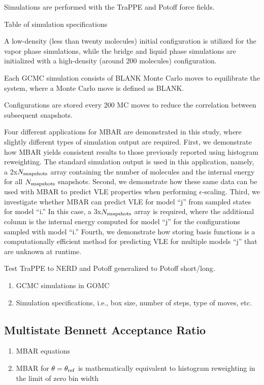 \documentclass[11pt,a4paper]{article}
\begin{document}
Simulations are performed with the TraPPE and Potoff force fields.

Table of simulation specifications 

A low-density (less than twenty molecules) initial configuration is utilized for the vapor phase simulations, while the bridge and liquid phase simulations are initialized with a high-density (around 200 molecules) configuration.

Each GCMC simulation consists of BLANK Monte Carlo moves to equilibrate the system, where a Monte Carlo move is defined as BLANK. 

Configurations are stored every 200 MC moves to reduce the correlation between subsequent snapshots.

Four different applications for MBAR are demonstrated in this study, where slightly different types of simulation output are required. First, we demonstrate how MBAR yields consistent results to those previously reported using histogram reweighting. The standard simulation output is used in this application, namely, a 2x$N_{\rm snapshots}$ array containing the number of molecules and the internal energy for all $N_{\rm snapshots}$ snapshots. Second, we demonstrate how these same data can be used with MBAR to predict VLE properties when performing $\epsilon$-scaling. Third, we investigate whether MBAR can predict VLE for model ``j'' from sampled states for model ``i.'' In this case, a 3x$N_{\rm snapshots}$ array is required, where the additional column is the internal energy computed for model ``j'' for the configurations sampled with model ``i.'' Fourth, we demonstrate how storing basis functions is a computationally efficient method for predicting VLE for multiple models ``j'' that are unknown at runtime.   

Test TraPPE to NERD and Potoff generalized to Potoff short/long.

\begin{enumerate}
	\item GCMC simulations in GOMC
	\item Simulation specifications, i.e., box size, number of steps, type of moves, etc.
\end{enumerate}

\subsection{Multistate Bennett Acceptance Ratio}

\begin{enumerate}
	\item MBAR equations
	\item MBAR for $\theta = \theta_{\rm ref}$ is mathematically equivalent to histogram reweighting in the limit of zero bin width
\end{enumerate}
\end{document}
